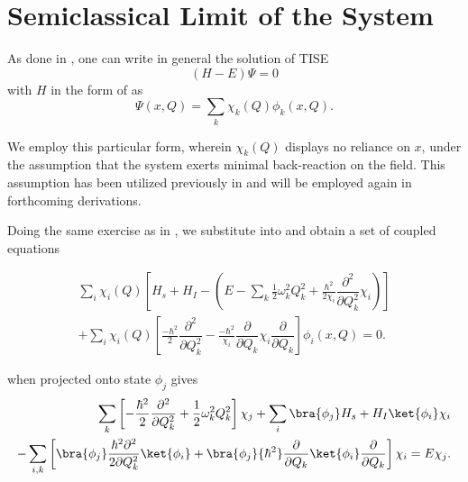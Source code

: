 \section{Semiclassical Limit of the System\label{sec:class_jcm_sec1}}
As done in , one can write in general the solution of 
TISE 
\begin{equation}
    \label{eq:class_jcm_eq_TISE}
    (H - E)\Psi = 0
\end{equation}
with $H$ in the form of  as 
\begin{equation}
    \label{eq:class_jcm_eq3}
    \Psi(x, Q) = \sum_{k} \chi_k(Q) \phi_k(x, Q).
\end{equation}

We employ this particular form, wherein $\chi_k(Q)$ displays no reliance on $x$, 
under the assumption that the system exerts minimal back-reaction on the field.
This assumption has been utilized previously in  
and will be employed again in forthcoming derivations.

Doing the same exercise as in , we substitute
 into  and obtain a set of coupled equations

\begin{align}
    \label{eq:class_jcm_eq4}
   \sum_i \chi_i(Q) \left[H_s + H_I - \left(E - \sum_k
    \frac{1}{2}\omega_k^2 Q_k^2 + \frac{\hbar^2}{2\chi_i}\dfrac{\partial^2}{\partial Q_k^2}
    \chi_i\right) \right]\nonumber \\
    + \sum_i \chi_i(Q) \left[
        \frac{-\hbar^2}{2}\dfrac{\partial^2}{\partial Q_k^2} - 
        \frac{-\hbar^2}{\chi_i}\dfrac{\partial}{\partial Q_k}\chi_i\dfrac{\partial}{\partial Q_k}
    \right]\phi_i (x, Q) = 0.
\end{align}

 when projected onto state \(\phi_j\) gives
\begin{align}
    \label{eq:class_jcm_eq5}
    \sum_k \left[-\frac{\hbar^2}{2}\dfrac{\partial^2}{\partial Q_k^2}
     + \frac{1}{2} \omega_k^2 Q_k^2 \right]\chi_j
    + \sum_i \bra{\phi_j}H_s + H_I\ket{\phi_i}\chi_i \nonumber \\
   - \sum_{i, k} \left[
    \bra{\phi_j}\frac{\hbar^2 \partial^2}{2 \partial Q_k^2}\ket{\phi_i}
    + \bra{\phi_j}{\hbar^2}\dfrac{\partial}{\partial Q_k}\ket{\phi_i}\dfrac{\partial}{\partial Q_k}
   \right]\chi_i = E \chi_j.
\end{align}

